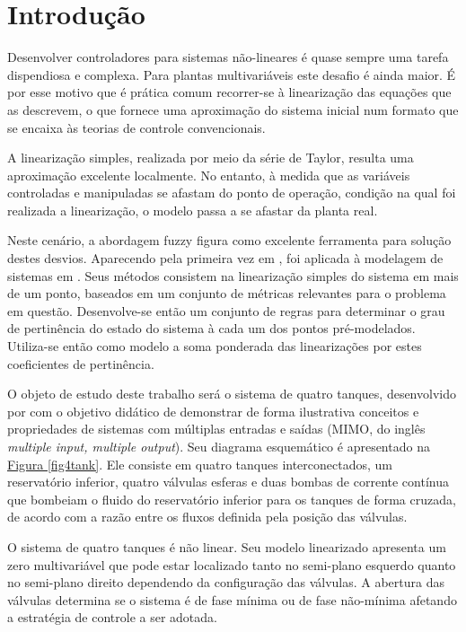 %

\chapter{Introdução}

Desenvolver controladores para sistemas não-lineares é quase sempre uma tarefa dispendiosa e complexa. Para plantas multivariáveis este desafio é ainda maior. É por esse motivo que é prática comum recorrer-se à linearização das equações que as descrevem, o que fornece uma aproximação do sistema inicial num formato que se encaixa às teorias de controle convencionais.

A linearização simples, realizada por meio da série de Taylor, resulta uma aproximação excelente localmente. No entanto, à medida que as variáveis controladas e manipuladas se afastam do ponto de operação, condição na qual foi realizada a linearização, o modelo passa a se afastar da planta real.

Neste cenário, a abordagem fuzzy figura como excelente ferramenta para solução destes desvios. Aparecendo pela primeira vez em \cite{zadeh65}, foi aplicada à modelagem de sistemas em \cite{takagi_sugeno}. Seus métodos consistem na linearização simples do sistema em mais de um ponto, baseados em um conjunto de métricas relevantes para o problema em questão. Desenvolve-se então um conjunto de regras para determinar o grau de pertinência do estado do sistema à cada um dos pontos pré-modelados. Utiliza-se então como modelo a soma ponderada das linearizações por estes coeficientes de pertinência. 

O objeto de estudo deste trabalho será o sistema de quatro tanques, desenvolvido por \cite{johansson2} com o objetivo didático de demonstrar de forma ilustrativa conceitos e propriedades de sistemas com múltiplas entradas e saídas (MIMO, do inglês \textit{multiple input, multiple output}). Seu diagrama esquemático é apresentado na  \hyperref[fig4tank]{Figura \ref{fig4tank}}. Ele consiste em quatro tanques interconectados, um reservatório inferior, quatro válvulas esferas e duas bombas de corrente contínua que bombeiam o fluido do reservatório inferior para os tanques de forma cruzada, de acordo com a razão entre os fluxos definida pela posição das válvulas.

O sistema de quatro tanques é não linear. Seu modelo linearizado apresenta um zero multivariável que pode estar localizado tanto no semi-plano esquerdo quanto no semi-plano direito dependendo da configuração das válvulas. A abertura das válvulas determina se o sistema é de fase mínima ou de fase não-mínima afetando a estratégia de controle a ser adotada.

